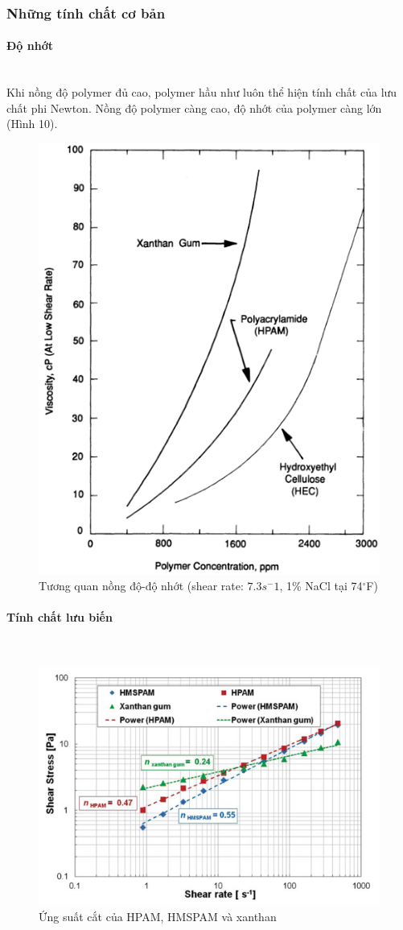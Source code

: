 \documentclass[12pt,a4paper]{article}
\newcommand{\subsubsubsection}[1]{\paragraph{#1}\mbox{}\\}
\begin{document}
	\subsubsection{Những tính chất cơ bản}
	\subsubsubsection{Độ nhớt}
	Khi nồng độ polymer đủ cao, polymer hầu như luôn thể hiện tính chất của lưu chất phi Newton. Nồng độ polymer càng cao, độ nhớt của polymer càng lớn (Hình 10).
		\begin{figure}[h]
			\centering
			\includegraphics[scale=.8]{Fig/concentration.PNG}
			\caption{Tương quan nồng độ-độ nhớt (shear rate: $7.3s^-1$, 1\% NaCl tại 74$^\circ$F) \cite{sorbie2013polymer}}
		\end{figure}
	\subsubsubsection{Tính chất lưu biến}
		\begin{figure}[h]
			\centering
			\includegraphics[scale=.9]{Fig/Shearstress.PNG}
			\caption{Ứng suất cắt của HPAM, HMSPAM và xanthan \cite{wei2014mechanical}}
		\end{figure}
\end{document}
